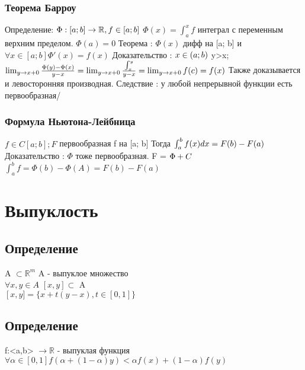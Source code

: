 \documentclass[12pt, a4paper]{article}
\newcommand{\nl}{\newline}
\newcommand{\intba}{\int^b_a}
\begin{document}
        \subsubsection{Теорема Барроу}
        Определение: \nl
        $\Phi : [a;b] \rightarrow \mathbb{R}, f \in [a;b] \nl$
        $\Phi(x) = \int_a^x f$ интеграл с переменным верхним пределом. \nl
        $\Phi(a) = 0$
        Теорема : 
        $\Phi(x)$ дифф на [a; b] и $\forall x \in [a; b] \Phi'(x) = f(x)$ \nl
        Доказательство : \nl
        $x \in (a; b) \nl$
        y>x; $\lim_{y \to x+0} \frac{\Phi(y)-\Phi(x)}{y-x} = \lim_{y \to x+0}\frac{\int^y_x}{y-x} = \lim_{y \to x+0} f(c) = f(x) \nl $
        Также доказывается и левосторонняя производная. \nl
        Следствие : у любой непрерывной функции есть первообразная/
        
        \subsubsection{Формула Ньютона-Лейбница}
        $f \in C[a; b]; F$ первообразная f на [a; b]\nl
        Тогда $\intba f(x)dx = F(b)-F(a) \nl$
        Доказательство : \nl
        $\Phi$ тоже первообразная. F = $\Phi + C\nl$
        $\intba f = \Phi(b)-\Phi(A) = F(b)-F(a)$
        
    

    

\section{Выпуклость}

\subsection{Определение}
    A $\subset \mathbb{R}^m$ A - выпуклое множество \\
    $\forall x, y \in A$  $[x,y] \subset$ A \\
    $\left[x,y]=\lbrace x+t(y-x), t \in [0,1] \rbrace$ \\

\subsection{Определение}
    f:<a,b> $\rightarrow \mathbb{R}$ - выпуклая функция \\
    $\forall \alpha \in [0,1] f (\alpha + (1-\alpha)y)< \alpha f(x) + (1-\alpha)f(y)$ \\
\end{document}
